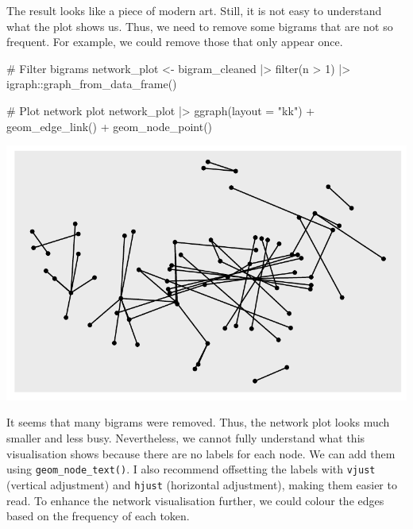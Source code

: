 \documentclass[
  letterpaper,
  DIV=11,
  numbers=noendperiod]{scrreprt}
\newenvironment{Shaded}{\begin{snugshade}}{\end{snugshade}}
\newcommand{\AttributeTok}[1]{\textcolor[rgb]{0.40,0.45,0.13}{#1}}
\newcommand{\CommentTok}[1]{\textcolor[rgb]{0.37,0.37,0.37}{#1}}
\newcommand{\DecValTok}[1]{\textcolor[rgb]{0.68,0.00,0.00}{#1}}
\newcommand{\FunctionTok}[1]{\textcolor[rgb]{0.28,0.35,0.67}{#1}}
\newcommand{\NormalTok}[1]{\textcolor[rgb]{0.00,0.23,0.31}{#1}}
\newcommand{\OtherTok}[1]{\textcolor[rgb]{0.00,0.23,0.31}{#1}}
\newcommand{\SpecialCharTok}[1]{\textcolor[rgb]{0.37,0.37,0.37}{#1}}
\newcommand{\StringTok}[1]{\textcolor[rgb]{0.13,0.47,0.30}{#1}}
\begin{document}
The result looks like a piece of modern art. Still, it is not easy to
understand what the plot shows us. Thus, we need to remove some bigrams
that are not so frequent. For example, we could remove those that only
appear once.

\begin{Shaded}
\begin{Highlighting}[]
\CommentTok{\# Filter bigrams}
\NormalTok{network\_plot }\OtherTok{\textless{}{-}}\NormalTok{ bigram\_cleaned }\SpecialCharTok{|\textgreater{}}
  \FunctionTok{filter}\NormalTok{(n }\SpecialCharTok{\textgreater{}} \DecValTok{1}\NormalTok{) }\SpecialCharTok{|\textgreater{}}
\NormalTok{  igraph}\SpecialCharTok{::}\FunctionTok{graph\_from\_data\_frame}\NormalTok{()}

\CommentTok{\# Plot network plot}
\NormalTok{network\_plot }\SpecialCharTok{|\textgreater{}}
  \FunctionTok{ggraph}\NormalTok{(}\AttributeTok{layout =} \StringTok{"kk"}\NormalTok{) }\SpecialCharTok{+}
  \FunctionTok{geom\_edge\_link}\NormalTok{() }\SpecialCharTok{+}
  \FunctionTok{geom\_node\_point}\NormalTok{()}
\end{Highlighting}
\end{Shaded}

\includegraphics{14_mixed_methods_files/figure-pdf/ngrams-network-plot-step-two-1.pdf}

It seems that many bigrams were removed. Thus, the network plot looks
much smaller and less busy. Nevertheless, we cannot fully understand
what this visualisation shows because there are no labels for each node.
We can add them using \texttt{geom\_node\_text()}. I also recommend
offsetting the labels with \texttt{vjust} (vertical adjustment) and
\texttt{hjust} (horizontal adjustment), making them easier to read. To
enhance the network visualisation further, we could colour the edges
based on the frequency of each token.
\end{document}
